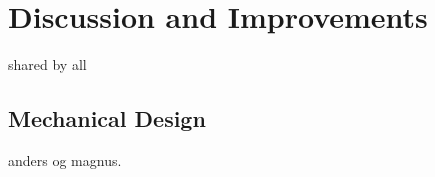 \section{Discussion and Improvements}
shared by all

\subsection{Mechanical Design} 
anders og magnus.


